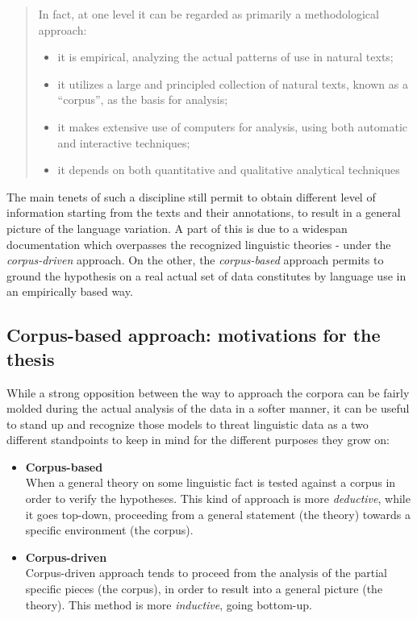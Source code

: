 \documentclass[a4paper,twoside,12pt,chapterprefix=false,bibliography=totocnumbered,listof=flat]{scrbook}
\providecommand{\tightlist}{%
  \setlength{\itemsep}{0pt}\setlength{\parskip}{0pt}}
\begin{document}
\begin{quote}
In fact, at one level it can be regarded as primarily a methodological
approach:

\begin{itemize}
\tightlist
\item
  it is empirical, analyzing the actual patterns of use in natural
  texts;
\item
  it utilizes a large and principled collection of natural texts, known
  as a \enquote{corpus}, as the basis for analysis;
\item
  it makes extensive use of computers for analysis, using both automatic
  and interactive techniques;
\item
  it depends on both quantitative and qualitative analytical techniques
  \citep{biber1998}
\end{itemize}
\end{quote}

The main tenets of such a discipline still permit to obtain different
level of information starting from the texts and their annotations, to
result in a general picture of the language variation. A part of this is
due to a widespan documentation which overpasses the recognized
linguistic theories - under the \emph{corpus-driven} approach. On the
other, the \emph{corpus-based} approach permits to ground the hypothesis
on a real actual set of data constitutes by language use in an
empirically based way.

\subsection{Corpus-based approach: motivations for the
thesis}\label{corpus-based-approach-motivations-for-the-thesis}

While a strong opposition between the way to approach the corpora can be
fairly molded during the actual analysis of the data in a softer manner,
it can be useful to stand up and recognize those models to threat
linguistic data as a two different standpoints to keep in mind for the
different purposes they grow on:

\begin{itemize}
\item
  \textbf{Corpus-based}\\
  When a general theory on some linguistic fact is tested against a
  corpus in order to verify the hypotheses. This kind of approach is
  more \emph{deductive}, while it goes top-down, proceeding from a
  general statement (the theory) towards a specific environment (the
  corpus).
\item
  \textbf{Corpus-driven}\\
  Corpus-driven approach tends to proceed from the analysis of the
  partial specific pieces (the corpus), in order to result into a
  general picture (the theory). This method is more \emph{inductive},
  going bottom-up.
\end{itemize}
\end{document}

